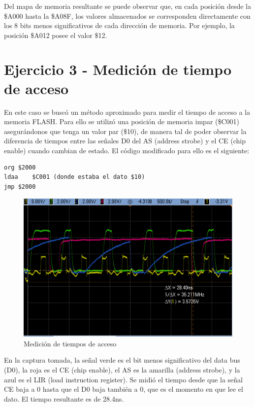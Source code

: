 \documentclass{article}
\begin{document}
Del mapa de memoria resultante se puede observar que, en cada posición desde la \$A000 hasta la \$A08F, los valores almacenados se corresponden directamente con los 8 bits menos significativos de cada dirección de memoria. Por ejemplo, la posición \$A012 posee el valor \$12. 

\newpage

\section*{Ejercicio 3 - Medición de tiempo de acceso}

En este caso se buscó un método aproximado para medir el tiempo de acceso a la memoria FLASH. Para ello se utilizó una posición de memoria impar (\$C001) asegurándonos que tenga un valor par (\$10), de manera tal de poder observar la diferencia de tiempos entre las señales D0 del AS (address strobe) y el CE (chip enable) cuando cambian de estado. El código modificado para ello es el siguiente:

\begin{lstlisting}
org	$2000 
ldaa	$C001 (donde estaba el dato $10) 
jmp	$2000
\end{lstlisting}

\begin{figure}[ht]
	\centering
	\includegraphics[width=0.8 \textwidth]
	{../Ej3/guia1_32.png}
	\caption{Medición de tiempos de acceso}
	\label{fig:ej2}
\end{figure}

En la captura tomada, la señal verde es el bit menos significativo del data bus (D0), la roja es el CE (chip enable), el AS es la amarilla (address strobe), y la azul es el LIR (load instruction register). 
Se midió el tiempo desde que la señal CE baja a 0 hasta que el D0 baja también a 0, que es el momento en que lee el dato. El tiempo resultante es de 28.4ns.
\end{document}
